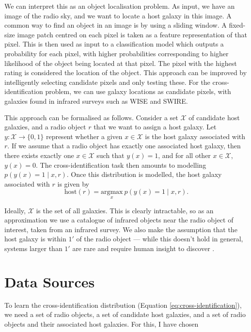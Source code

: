   We can interpret this as an object localisation problem. As input, we have an
  image of the radio sky, and we want to locate a host galaxy in this image. A
  common way to find an object in an image is by using a sliding window. A
  fixed-size image patch centred on each pixel is taken as a feature
  representation of that pixel. This is then used as input to a classification
  model which outputs a probability for each pixel, with higher probabilities
  corresponding to higher likelihood of the object being located at that pixel.
  The pixel with the highest rating is considered the location of the object.
  This approach can be improved by intelligently selecting candidate pixels and
  only testing these. For the cross-identification problem, we can use galaxy
  locations as candidate pixels, with galaxies found in infrared surveys such
  as WISE and SWIRE.

  This approach can be formalised as follows. Consider a set $\mathcal X$ of
  candidate host galaxies, and a radio object $r$ that we want to assign a
  host galaxy. Let $y : \mathcal X \to \{0, 1\}$ represent whether a given $x
  \in \mathcal X$ is the host galaxy associated with $r$. If we assume that a
  radio object has exactly one associated host galaxy, then there exists
  exactly one $x \in \mathcal X$ such that $y(x) = 1$, and for all other $x \in
  \mathcal X$, $y(x) = 0$. The cross-identification task then amounts to
  modelling $p(y(x) = 1 \mid x, r)$. Once this distribution is modelled, the
  host galaxy associated with $r$ is given by
  \begin{equation}
      \label{eq:cross-identification}
      \mbox{host}(r) = \underset{x}{\mbox{argmax}}\ p(y(x) = 1 \mid x, r).
  \end{equation}

  Ideally, $\mathcal X$ is the set of all galaxies. This is clearly
  intractable, so as an approximation we use a catalogue of infrared objects
  near the radio object of interest, taken from an infrared survey. We also
  make the assumption that the host galaxy is within $1'$ of the radio object
  --- while this doesn't hold in general, systems larger than $1'$ are rare and
  require human insight to discover \citep{banfield16}.

\section{Data Sources}
\label{sec:data}

  To learn the cross-identification distribution (Equation \ref{eq:cross-identification}), we need a set of radio objects, a set of candidate host galaxies, and a set of radio objects and their associated host galaxies. For this, I have chosen 

